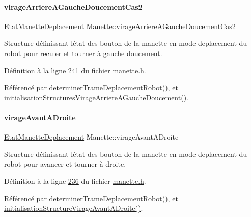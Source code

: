 \paragraph{\texorpdfstring{virage\+Arriere\+A\+Gauche\+Doucement\+Cas2}{virageArriereAGaucheDoucementCas2}}
{\footnotesize\ttfamily \hyperlink{struct_etat_manette_deplacement}{Etat\+Manette\+Deplacement} Manette\+::virage\+Arriere\+A\+Gauche\+Doucement\+Cas2\hspace{0.3cm}{\ttfamily [private]}}



Structure définissant l\textquotesingle{}état des bouton de la manette en mode deplacement du robot pour reculer et tourner à gauche doucement. 



Définition à la ligne \hyperlink{manette_8h_source_l00241}{241} du fichier \hyperlink{manette_8h_source}{manette.\+h}.



Référencé par \hyperlink{manette_8cpp_source_l00341}{determiner\+Trame\+Deplacement\+Robot()}, et \hyperlink{manette_8cpp_source_l00269}{initialisation\+Structures\+Virage\+Arriere\+A\+Gauche\+Doucement()}.

\mbox{\label{class_manette_a91afd62402f690f74a7e351c9aa8f6ec}} 
\paragraph{\texorpdfstring{virage\+Avant\+A\+Droite}{virageAvantADroite}}
{\footnotesize\ttfamily \hyperlink{struct_etat_manette_deplacement}{Etat\+Manette\+Deplacement} Manette\+::virage\+Avant\+A\+Droite\hspace{0.3cm}{\ttfamily [private]}}



Structure définissant l\textquotesingle{}état des bouton de la manette en mode deplacement du robot pour avancer et tourner à droite. 



Définition à la ligne \hyperlink{manette_8h_source_l00236}{236} du fichier \hyperlink{manette_8h_source}{manette.\+h}.



Référencé par \hyperlink{manette_8cpp_source_l00341}{determiner\+Trame\+Deplacement\+Robot()}, et \hyperlink{manette_8cpp_source_l00232}{initialisation\+Structure\+Virage\+Avant\+A\+Droite()}.

